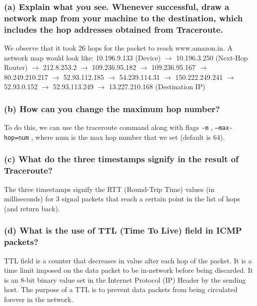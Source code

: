 \documentclass{article}
\let\oldtexttt\texttt
\renewcommand{\texttt}[1]{
  \colorbox{bgcolor}{\oldtexttt{#1}}
  }
\begin{document}
\subsubsection*{(a) Explain what you see. Whenever successful, draw a network map from your machine to the destination, which includes the hop addresses obtained from Traceroute.}
We observe that it took 26 hops for the packet to reach www.amazon.in. A network map would look like:
10.196.9.133 (Device) $\rightarrow$ 10.196.3.250 (Next-Hop Router) $\rightarrow$
212.8.253.2  $\rightarrow$
109.236.95.182  $\rightarrow$
109.236.95.167  $\rightarrow$
80.249.210.217  $\rightarrow$
52.93.112.185  $\rightarrow$
54.239.114.31  $\rightarrow$
150.222.249.241  $\rightarrow$
52.93.0.152  $\rightarrow$
52.93.113.249  $\rightarrow$
13.227.210.168 (Destination IP)

\subsubsection*{(b) How can you change the maximum hop number?}
To do this, we can use the traceroute command along with flags \texttt{-m}, \texttt{--max-hop=num}, where num is the max hop number that we set (default is 64).

\subsubsection*{(c) What do the three timestamps signify in the result of Traceroute?}
The three timestamps signify the RTT (Round-Trip Time) values (in milliseconds) for 3 signal packets that reach a certain point in the list of hops (and return back). 

\subsubsection*{(d) What is the use of TTL (Time To Live) field in ICMP packets?}
TTL field is a counter that decreases in value after each hop of the packet. It is a time limit imposed on the data packet to be in-network before being discarded. It is an 8-bit binary value set in the Internet Protocol (IP) Header by the sending host. The purpose of a TTL is to prevent data packets from being circulated forever in the network.
\end{document}
